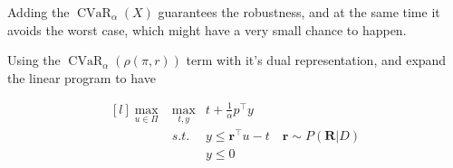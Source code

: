 \documentclass{article}
\theoremstyle{remark}
\theoremstyle{remark}
\theoremstyle{remark}
\theoremstyle{remark}
\theoremstyle{remark}
\theoremstyle{remark}
\newcommand{\cvalatrisk}[2]{\operatorname{CVaR}_{#1}(#2)}
\begin{document}
Adding the $\cvalatrisk{\alpha}{X}$ guarantees the robustness, and at the same time it avoids the worst case, which might have a very small chance to happen.

Using the $\cvalatrisk{\alpha}{\rho(\pi, r)}$ term with it's dual representation, and expand the linear program to have

\[
\begin{matrix*}[l]
  \max\limits_{u \in \Pi} & \max\limits_{t,y} & t+ \frac{1}{\alpha} p^\top y \\
   & s.t. & y \leq \mathbf{r}^\top u - t \quad \mathbf{r} \sim P(\mathbf{R}|D) \\
   & & y \leq 0
\end{matrix*}
\]


  



  


  


\end{document}
